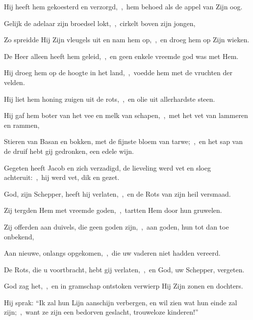 \documentclass[12pt,twoside,a5paper]{article}
\begin{document}
\begin{halfparskip}
  Hij heeft hem gekoesterd en verzorgd,~\sep\ hem behoed als de appel van Zijn oog.

  Gelijk de adelaar zijn broedsel lokt,~\sep\ cirkelt boven zijn jongen,

  Zo spreidde Hij Zijn vleugels uit en nam hem op,~\sep\ en droeg hem op Zijn wieken.

  De Heer alleen heeft hem geleid,~\sep\ en geen enkele vreemde god was met Hem.

  Hij droeg hem op de hoogte in het land,~\sep\ voedde hem met de vruchten der velden.

  Hij liet hem honing zuigen uit de rots,~\sep\ en olie uit allerhardste steen.

  Hij gaf hem boter van het vee en melk van schapen,~\sep\ met het vet van lammeren en rammen,

  Stieren van Basan en bokken, met de fijnste bloem van tarwe;~\sep\ en het sap van de druif hebt gij gedronken, een edele wijn.

  Gegeten heeft Jacob en zich verzadigd, de lieveling werd vet en sloeg achteruit:~\sep\ hij werd vet, dik en gezet.

  God, zijn Schepper, heeft hij verlaten,~\sep\ en de Rots van zijn heil versmaad.

  Zij tergden Hem met vreemde goden,~\sep\ tartten Hem door hun gruwelen.

  Zij offerden aan duivels, die geen goden zijn,~\sep\ aan goden, hun tot dan toe onbekend,

  Aan nieuwe, onlangs opgekomen,~\sep\ die uw vaderen niet hadden vereerd.

  De Rots, die u voortbracht, hebt gij verlaten,~\sep\ en God, uw Schepper, vergeten.

  God zag het,~\sep\ en in gramschap ontstoken verwierp Hij Zijn zonen en dochters.

  Hij sprak: ``Ik zal hun Lijn aanschijn verbergen, en wil zien wat hun einde zal zijn;~\sep\ want ze zijn een bedorven geslacht, trouweloze kinderen!''
\end{halfparskip}


\end{document}
